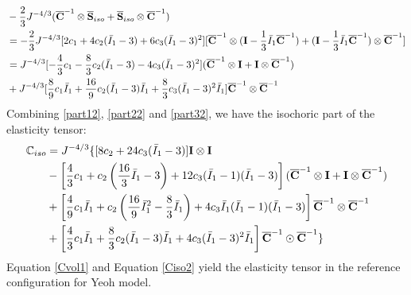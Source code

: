 \begin{equation} \label{part32}
\begin{split}
&-\frac{2}{3}J^{-4/3}({\overline{\bold{C}}}^{-1} \otimes {\overline{\bold{S}}}_{iso} + {\overline{\bold{S}}}_{iso} \otimes {\overline{{\bold{C}}}^{-1}})\\
&=
-\frac{2}{3}J^{-4/3}[2c_1 + 4c_2({\bar{I}}_1 - 3) + 6c_3({\bar{I}}_1 - 3)^2]
[{\overline{\bold{C}}}^{-1} \otimes (\bold{I} - \frac{1}{3}{\bar{I}_1}{\overline{\bold{C}}}^{-1}) + 
(\bold{I} - \frac{1}{3}{\bar{I}_1}{\overline{\bold{C}}}^{-1}) \otimes {\overline{\bold{C}}}^{-1}]\\
&=
J^{-4/3}  [-\frac{4}{3}c_1 - \frac{8}{3}c_2({\bar{I}}_1 - 3) - 4c_3({\bar{I}}_1 - 3)^2] ({\overline{\bold{C}}}^{-1} \otimes \bold{I} + \bold{I} \otimes {\overline{\bold{C}}}^{-1}) \\
&+ J^{-4/3}  [\frac{8}{9}c_1{\bar{I}}_1 + \frac{16}{9}c_2({\bar{I}}_1 - 3){\bar{I}}_1 + \frac{8}{3}c_3({\bar{I}}_1 - 3)^2{\bar{I}}_1 ] {\overline{\bold{C}}}^{-1} \otimes {\overline{\bold{C}}}^{-1}
\end{split}
\end{equation}
Combining \ref{part12}, \ref{part22} and \ref{part32}, we have the isochoric part of the elasticity tensor:
\begin{equation} \label{Ciso2}
\begin{split}
{\mathbb{C}}_{iso} &= J^{-4/3} \{
[8c_2+24c_3({\bar{I}}_1 - 3)] \bold{I} \otimes \bold{I} \\
&- \left[\frac{4}{3}c_1 + c_2\left(\frac{16}{3}{\bar{I}}_1 - 3\right) + 12c_3({\bar{I}}_1 - 1)({\bar{I}}_1 - 3)\right]({\overline{\bold{C}}}^{-1} \otimes \bold{I} + \bold{I} \otimes {\overline{\bold{C}}}^{-1})\\
&+ \left[\frac{4}{9}c_1{\bar{I}}_1 + c_2\left(\frac{16}{9}{{\bar{I}}_1}^2 - \frac{8}{3}{\bar{I}}_1\right) + 4c_3{\bar{I}}_1({\bar{I}}_1 - 1)({\bar{I}}_1 - 3)\right] {\overline{\bold{C}}}^{-1} \otimes {\overline{\bold{C}}}^{-1} \\
&+ \left[\frac{4}{3}c_1{\bar{I}}_1 + \frac{8}{3}c_2({\bar{I}}_1 - 3){\bar{I}}_1 + 4c_3({\bar{I}}_1 - 3)^2{\bar{I}}_1\right]{\overline{\bold{C}}}^{-1} \odot {\overline{\bold{C}}}^{-1}
\}
\end{split}
\end{equation}
Equation \ref{Cvol1} and Equation \ref{Ciso2} yield the elasticity tensor in the reference configuration for Yeoh model.


%
